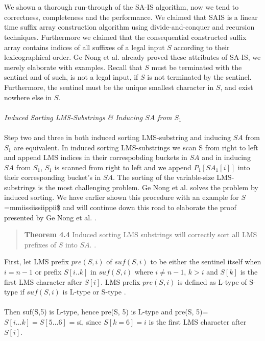 \documentclass[12pt]{article} %
\begin{document}
\\ \\
We shown a thorough run-through of the SA-IS algorithm, now we tend to correctness, completeness and the performance. We claimed that SAIS is a linear time suffix array construction algorithm using divide-and-conquer and recursion techniques. Furthermore we claimed that the consequential constructed suffix array contains indices of all suffixes of a legal input $S$ according to their lexicographical order. Ge Nong et al. \cite{twoeffecient} already proved these attributes of SA-IS, we merely elaborate with examples. Recall that $S$ must be terminated with the sentinel and of such, is not a legal input, if $S$ is not terminated by the sentinel. Furthermore, the sentinel must be the unique smallest character in $S$, and exist nowhere else in $S$.  
\\ \\
\textit{Induced Sorting LMS-Substrings \& Inducing $SA$ from $S_1$ }
\\ \\
Step two and three in both induced sorting LMS-substring and inducing $SA$ from $S_1$ are equivalent. In induced sorting LMS-substrings we scan S from right to left and append LMS indices in their correspobding buckets in $SA$ and in inducing $SA$ from $S_1$, $S_1$ is scanned from right to left and we append $P_1[SA_1[i]]$ into their corresponding bucket's in $SA$.
The sorting of the variable-size LMS-substrings is the most challenging problem. Ge Nong et al. \cite{twoeffecient} solves the problem by induced sorting. We have earlier shown this procedure with an example for $S$=mmiissiissiippii\$ and will continue down this road to elaborate the proof presented by Ge Nong et al. \cite{twoeffecient}.
\begin{quote}
\textbf{Theorem 4.4} Induced sorting LMS substrings will correctly sort all LMS prefixes of $S$ into $SA$. \cite{twoeffecient}.
\end{quote}
First, let LMS prefix $pre(S, i)$ of $suf(S, i)$ to be either the sentinel itself when $i = n-1$ or prefix $S[i..k]$ in $suf(S, i)$ where $i \neq n-1$, $k > i$ and $S[k]$ is the first LMS character after $S[i]$. LMS prefix $pre(S,i)$ is defined as L-type of S-type if $suf(S, i)$ is L-type or S-type \cite{twoeffecient}.
\\ \\
Then suf(S,5) is L-type, hence pre(S, 5) is L-type and pre(S, 5)=$S[i \ldots k] = S[5 \ldots 6]$ = si, since $S[k=6]=i$ is the first LMS character after $S[i]$. 
\\ \\
\end{document}
